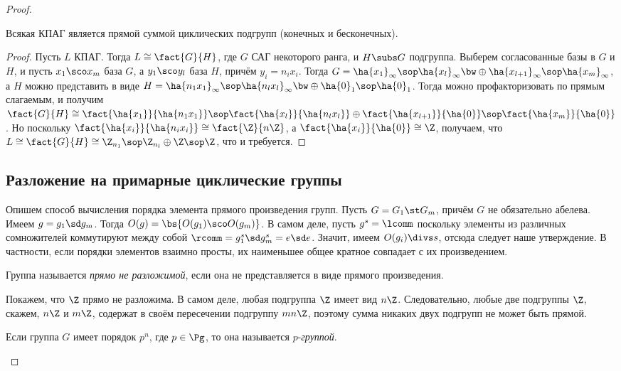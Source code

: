 \documentclass[a4paper]{article}
\begin{document}
\begin{proof}
\begin{imp}
Всякая КПАГ является прямой суммой циклических подгрупп (конечных и бесконечных).
\end{imp}
\begin{proof}
Пусть $L$ КПАГ. Тогда $L \cong \fact{G}{H}$, где $G$ САГ некоторого  ранга, и $H \subs G$ подгруппа.
Выберем согласованные базы в $G$ и $H$, и пусть $x_1\sco x_m$ база $G$, а $y_1\sco y_l$ база $H$, причём
$y_i=n_ix_i$. Тогда $G=\ha{x_1}_\infty\sop \ha{x_l}_\infty\bw\oplus\ha{x_{l+1}}_\infty\sop \ha{x_m}_\infty$, а
$H$ можно представить в виде $H=\ha{n_1x_1}_\infty\sop \ha{n_lx_l}_\infty\bw\oplus\ha{0}_1\sop \ha{0}_1$. Тогда
можно профакторизовать по прямым слагаемым, и получим $\fact{G}{H} \cong \fact{\ha{x_1}}{\ha{n_1x_1}}\sop
\fact{\ha{x_l}}{\ha{n_lx_l}}\oplus \fact{\ha{x_{l+1}}}{\ha{0}}\sop\fact{\ha{x_m}}{\ha{0}}$. Но поскольку
$\fact{\ha{x_i}}{\ha{n_ix_i}} \cong \fact{\Z}{n\Z}$, а $\fact{\ha{x_i}}{\ha{0}} \cong \Z$, получаем, что $L
\cong \fact{G}{H} \cong \Z_{n_1}\sop\Z_{n_l}\oplus\Z\sop \Z$, что и требуется.
\end{proof}

\subsection{Разложение на примарные циклические группы}

Опишем способ вычисления порядка элемента прямого произведения групп.  Пусть $G=G_1\st G_m$, причём
$G$ не обязательно абелева. Имеем $g=g_1\sd g_m$. Тогда $O(g)=\bs{O(g_1)\sco O(g_m)}$. В самом деле, пусть
$g^s=\lcomm$ поскольку элементы из различных сомножителей коммутируют между собой $\rcomm = g_1^s\sd
g_m^s=e\sd e$. Значит, имеем $O(g_i) \divs s$, отсюда следует наше утверждение. В частности, если порядки
элементов взаимно просты, их наименьшее общее кратное совпадает с их произведением.

\begin{df}
Группа называется \emph{прямо не разложимой}, если она не представляется  в виде прямого произведения.
\end{df}

Покажем, что $\Z$ прямо не разложима. В самом деле, любая подгруппа $\Z$ имеет вид $n\Z$. Следовательно,
любые две подгруппы $\Z$, скажем, $n\Z$ и $m\Z$, содержат в своём пересечении подгруппу $mn\Z$, поэтому сумма
никаких двух подгрупп не может быть прямой.

\begin{df}
Если группа $G$ имеет порядок $p^n$, где $p \in \Pg$, то она называется $p$-\emph{группой}.
\end{df}


\end{proof}
\end{document}
